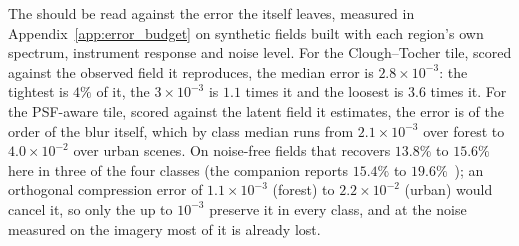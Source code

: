 The  should be read against the error the 
itself leaves, measured in Appendix~\ref{app:error_budget} on synthetic
fields built with each region's own spectrum, instrument response and
noise level. For the Clough--Tocher tile, scored against the observed
field it reproduces, the median error is $2.8\times10^{-3}$: the
tightest  is $4\%$ of it, the $3\times10^{-3}$
 is $1.1$ times it and the loosest is $3.6$ times it. For
the PSF-aware tile, scored against the latent field it estimates, the
error is of the order of the blur itself, which by class median runs
from $2.1\times10^{-3}$ over forest to $4.0\times10^{-2}$ over urban
scenes. On noise-free fields that  recovers
$13.8\%$ to $15.6\%$ here in three of the four classes (the companion reports
$15.4\%$ to $19.6\%$~\cite{delouis2026resample}); an orthogonal
compression error of $1.1\times10^{-3}$ (forest) to $2.2\times10^{-2}$
(urban) would cancel it, so only the  up to $10^{-3}$
preserve it in every class, and at the noise measured on the imagery
most of it is already lost.

